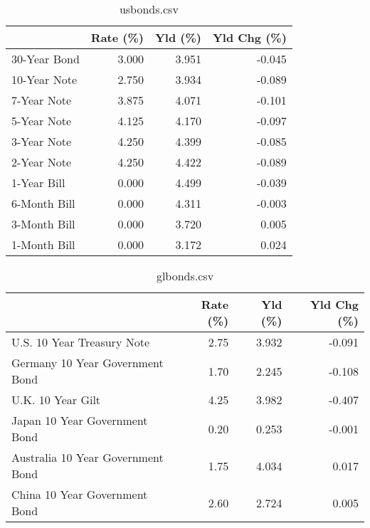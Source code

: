 \documentclass{article}%
\begin{document}
%


\begin{table}[htbp]%
\caption{usbonds.csv}%
\centering%
\begin{adjustbox}{width=1\textwidth}%
\begin{tabular}{lrrr}
\toprule
             &  Rate (\%) &  Yld (\%) &  Yld Chg (\%) \\
\midrule
30-Year Bond &     3.000 &    3.951 &       -0.045 \\
10-Year Note &     2.750 &    3.934 &       -0.089 \\
 7-Year Note &     3.875 &    4.071 &       -0.101 \\
 5-Year Note &     4.125 &    4.170 &       -0.097 \\
 3-Year Note &     4.250 &    4.399 &       -0.085 \\
 2-Year Note &     4.250 &    4.422 &       -0.089 \\
 1-Year Bill &     0.000 &    4.499 &       -0.039 \\
6-Month Bill &     0.000 &    4.311 &       -0.003 \\
3-Month Bill &     0.000 &    3.720 &        0.005 \\
1-Month Bill &     0.000 &    3.172 &        0.024 \\
\bottomrule
\end{tabular}
%
\end{adjustbox}%
\end{table}

%


\begin{table}[htbp]%
\caption{glbonds.csv}%
\centering%
\begin{adjustbox}{width=1\textwidth}%
\begin{tabular}{lrrr}
\toprule
                                  &  Rate (\%) &  Yld (\%) &  Yld Chg (\%) \\
\midrule
       U.S. 10 Year Treasury Note &      2.75 &    3.932 &       -0.091 \\
  Germany 10 Year Government Bond &      1.70 &    2.245 &       -0.108 \\
                U.K. 10 Year Gilt &      4.25 &    3.982 &       -0.407 \\
    Japan 10 Year Government Bond &      0.20 &    0.253 &       -0.001 \\
Australia 10 Year Government Bond &      1.75 &    4.034 &        0.017 \\
    China 10 Year Government Bond &      2.60 &    2.724 &        0.005 \\
\bottomrule
\end{tabular}
%
\end{adjustbox}%
\end{table}
\end{document}
